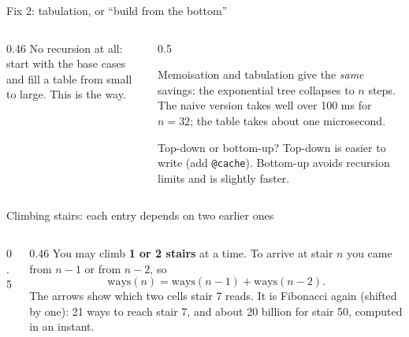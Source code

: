 \documentclass[aspectratio=169,10pt]{beamer}
\newcommand{\figtab}[2][0.5]{\begin{sfig}[#1]\end{sfig}}
\begin{document}
\begin{frame}{Fix 2: tabulation, or ``build from the bottom''}
\begin{columns}[T]
\begin{column}{0.46\textwidth}
\vspace{2mm}
\vspace{2mm}
{\small No recursion at all: start with the base cases and fill a table from small to large. This is the  way.}
\end{column}
\begin{column}{0.5\textwidth}
\vspace{2mm}
{\small
Memoisation and tabulation give the \emph{same} savings: the exponential tree collapses to $n$ steps. The naive version takes well over 100 ms for $n=32$; the table takes about one microsecond.

\vspace{2mm}
\begin{block}{Top-down or bottom-up?}
{\small Top-down is easier to write (add \texttt{@cache}). Bottom-up avoids recursion limits and is slightly faster.}
\end{block}}
\end{column}
\end{columns}
\end{frame}

\begin{frame}{Climbing stairs: each entry depends on two earlier ones}
\figtab[0.22]{fig_stairs}
\vspace{1mm}
\begin{columns}[T]
\begin{column}{0.5\textwidth}
\vspace{1mm}
\end{column}
\begin{column}{0.46\textwidth}
{\small
You may climb \textbf{1 or 2 stairs} at a time. To arrive at stair $n$ you came from $n-1$ or from $n-2$, so
\[\mathrm{ways}(n)=\mathrm{ways}(n-1)+\mathrm{ways}(n-2).\]
The arrows show which two cells stair 7 reads. It is Fibonacci again (shifted by one): 21 ways to reach stair 7, and about 20 billion for stair 50, computed in an instant.}
\end{column}
\end{columns}
\end{frame}
\end{document}
